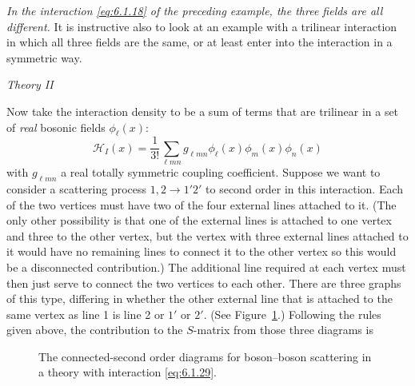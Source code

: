 \emph{In the interaction \eqref{eq:6.1.18} of the preceding example, the three fields
are all different.} It is instructive also to look at an example with a
trilinear interaction in which all three fields are the same, or at least enter
into the interaction in a symmetric way.

\begin{center}
\textit{Theory II}
\end{center}

Now take the interaction density to be a sum of terms that are trilinear in a
set of \emph{real} bosonic fields $\phi_\ell(x)$:
\begin{equation}
\mathcal H_I(x)=\frac{1}{3!}\sum_{\ell mn}g_{\ell mn}
 \phi_\ell(x)\phi_m(x)\phi_n(x)
\tag{6.1.29}
\label{eq:6.1.29}
\end{equation}
with $g_{\ell mn}$ a real totally symmetric coupling coefficient. Suppose we
want to consider a scattering process $1,2\to1'2'$ to second order in this
interaction. Each of the two vertices must have two of the four external lines
attached to it. (The only other possibility is that one of the external lines
is attached to one vertex and three to the other vertex, but the vertex with
three external lines attached to it would have no remaining lines to connect
it to the other vertex so this would be a disconnected contribution.) The
additional line required at each vertex must then just serve to connect the two
vertices to each other. There are three graphs of this type, differing in
whether the other external line that is attached to the same vertex as line 1
is line 2 or $1'$ or $2'$. (See Figure~\ref{fig:6.8}.) Following the rules given above,
the contribution to the $S$-matrix from those three diagrams is

\begingroup
\renewcommand{\thefigure}{6.\arabic{figure}}
\setcounter{figure}{7}
\begin{figure}[htbp]

\caption{The connected-second order diagrams for boson--boson scattering in a
theory with interaction \eqref{eq:6.1.29}.}
\label{fig:6.8}
\end{figure}
\endgroup

